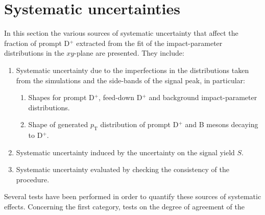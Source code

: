 \documentclass[b5paper,10pt,twoside,oldstyle,classica]{toptesi}
\newcommand{\pt}{p_\text{T}}
\begin{document}
\section{Systematic uncertainties}
In this section the various sources of systematic uncertainty that affect the fraction of prompt D$^+$ extracted from the fit of the impact-parameter distributions in the $xy$-plane are presented. They include:
\begin{enumerate}
\item Systematic uncertainty due to the imperfections in the distributions taken from the simulations and the side-bands of the signal peak, in particular:
\begin{enumerate}[label=\alph*.]
 \item Shapes for prompt D$^+$, feed-down D$^+$ and background impact-parameter distributions.
 \item Shape of generated $\pt$ distribution of prompt D$^+$ and B mesons decaying to D$^+$.
\end{enumerate}
\item Systematic uncertainty induced by the uncertainty on the signal yield $S$.
\item Systematic uncertainty evaluated by checking the consistency of the procedure.
\end{enumerate}
Several tests have been performed in order to quantify these sources of systematic effects. Concerning the first category, tests on the degree of agreement of the 
\end{document}

